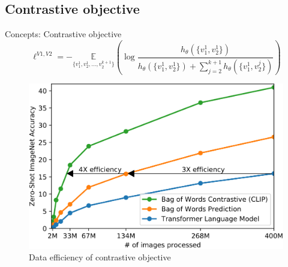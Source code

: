 \documentclass[xcolor=dvipsnames]{beamer}
\begin{document}
\subsection{Contrastive objective} %
\begin{frame}{Concepts: Contrastive objective}
  \begin{equation}
    \ell^{V1, V2} = - \underset{\{v_1^1, v_2^1, \ldots, v_2^{k+1}\}}{\mathbb{E}} \left( \log \frac{h_\theta(\{v_1^1,v_2^1\})}{h_\theta(\{v_1^1,v_2^1\}) + \sum_{j=2}^{k+1} h_\theta(\{v_1^1, v_2^j\})} \right)
  \end{equation}

  \vspace{1cm}

  \begin{figure}[ht]
    \begin{minipage}{0.67\textwidth}
      \centering
      \includegraphics[width=0.9\linewidth]{../../figures/02-04-text-support-img/data-efficiency}
    \end{minipage}
    \begin{minipage}[c]{0.3\textwidth}
      \caption{Data efficiency of contrastive objective \parencite{radford2021learning}}
    \end{minipage}
  \end{figure}
\end{frame}
\end{document}
